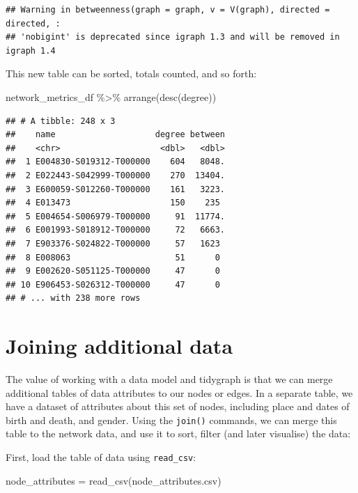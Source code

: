 \documentclass[
]{book}
\newenvironment{Shaded}{\begin{snugshade}}{\end{snugshade}}
\newcommand{\FunctionTok}[1]{\textcolor[rgb]{0.00,0.00,0.00}{#1}}
\newcommand{\NormalTok}[1]{#1}
\newcommand{\OtherTok}[1]{\textcolor[rgb]{0.56,0.35,0.01}{#1}}
\newcommand{\SpecialCharTok}[1]{\textcolor[rgb]{0.00,0.00,0.00}{#1}}
\newcommand{\StringTok}[1]{\textcolor[rgb]{0.31,0.60,0.02}{#1}}
\begin{document}
\begin{verbatim}
## Warning in betweenness(graph = graph, v = V(graph), directed = directed, :
## 'nobigint' is deprecated since igraph 1.3 and will be removed in igraph 1.4
\end{verbatim}

This new table can be sorted, totals counted, and so forth:

\begin{Shaded}
\begin{Highlighting}[]
\NormalTok{network\_metrics\_df }\SpecialCharTok{\%\textgreater{}\%} \FunctionTok{arrange}\NormalTok{(}\FunctionTok{desc}\NormalTok{(degree))}
\end{Highlighting}
\end{Shaded}

\begin{verbatim}
## # A tibble: 248 x 3
##    name                    degree between
##    <chr>                    <dbl>   <dbl>
##  1 E004830-S019312-T000000    604   8048.
##  2 E022443-S042999-T000000    270  13404.
##  3 E600059-S012260-T000000    161   3223.
##  4 E013473                    150    235 
##  5 E004654-S006979-T000000     91  11774.
##  6 E001993-S018912-T000000     72   6663.
##  7 E903376-S024822-T000000     57   1623 
##  8 E008063                     51      0 
##  9 E002620-S051125-T000000     47      0 
## 10 E906453-S026312-T000000     47      0 
## # ... with 238 more rows
\end{verbatim}

\hypertarget{joining-additional-data}{%
\section{Joining additional data}\label{joining-additional-data}}

The value of working with a data model and tidygraph is that we can merge additional tables of data attributes to our nodes or edges. In a separate table, we have a dataset of attributes about this set of nodes, including place and dates of birth and death, and gender. Using the \texttt{join()} commands, we can merge this table to the network data, and use it to sort, filter (and later visualise) the data:

First, load the table of data using \texttt{read\_csv}:

\begin{Shaded}
\begin{Highlighting}[]
\NormalTok{node\_attributes }\OtherTok{=} \FunctionTok{read\_csv}\NormalTok{(}\StringTok{\textquotesingle{}node\_attributes.csv\textquotesingle{}}\NormalTok{)}
\end{Highlighting}
\end{Shaded}
\end{document}

